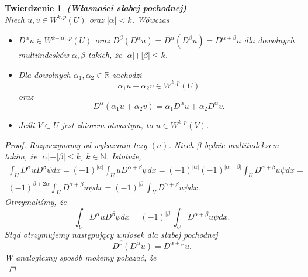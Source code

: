 \documentclass[12pt,a4paper,oneside,titlepage]{article}
\newtheorem{Twierdzenie}{Twierdzenie}
\begin{document}
\begin{Twierdzenie} \textbf{(Własności słabej pochodnej)} \\ Niech $u,v \in W^{k,p}(U)$ oraz $\vert \alpha \vert < k$. Wówczas
\begin{itemize}
\item[(a)] $D^{\alpha} u \in W^{k-\vert \alpha \vert,p}(U)$ oraz $D^{\beta}\left( D^{\alpha} u \right) = D^{\alpha}\left( D^{\beta} u \right)= D^{\alpha+\beta}u$ dla dowolnych multiindesków $\alpha, \beta$ takich, że $\vert \alpha \vert + \vert \beta \vert \leq k$.
\item[(b)] Dla dowolnych $\alpha_1, \alpha_2 \in \mathbb{R}$ zachodzi
\begin{equation}
\nonumber
\alpha_1 u +\alpha_2 v \in W^{k,p}(U)
\end{equation}
oraz
\begin{equation}
\nonumber
D^{\alpha}(\alpha_1 u + \alpha_2 v) = \alpha_1 D^{\alpha}u + \alpha_2 D^{\alpha} v .
\end{equation}
\item[(c)] Jeśli $V \subset U$ jest zbiorem otwartym, to $u \in W^{k,p}(V)$.
\end{itemize}
\begin{proof}
Rozpoczynamy od wykazania tezy $(a)$. Niech $\beta$ będzie multiindeksem takim, że $\vert \alpha \vert + \vert \beta \vert \leq k$, $k \in \mathbb{N}$. Istotnie,
\begin{equation}
\nonumber
\begin{split}
\int_{U} D^{\alpha} u D^{\beta} \psi dx = (-1)^{\vert \alpha \vert} \int_{U} u D^{\alpha + \beta} \psi
 dx  = (-1)^{\vert \alpha \vert} (-1)^{\vert \alpha + \beta \vert} \int_{U} D^{\alpha + \beta} u \psi dx = \\ (-1)^{\beta + 2 \alpha}  \int_{U} D^{\alpha + \beta} u \psi dx = (-1)^{\vert \beta \vert}  \int_{U} D^{\alpha + \beta} u \psi dx .
 \end{split}
\end{equation}
Otrzymaliśmy, że
\begin{equation}
\nonumber
\int_{U} D^{\alpha} u D^{\beta} \psi dx = (-1)^{\vert \beta \vert}  \int_{U} D^{\alpha + \beta} u \psi dx .
\end{equation}
Stąd otrzymujemy następujący wniosek dla słabej pochodnej
\begin{equation}
\nonumber
D^{\beta} \left( D^{\alpha} u \right) = D^{\alpha+\beta}u .
\end{equation}
W analogiczny sposób możemy pokazać, że
\begin{equation}

\end{equation}
\end{proof}
\end{Twierdzenie}
\end{document}
